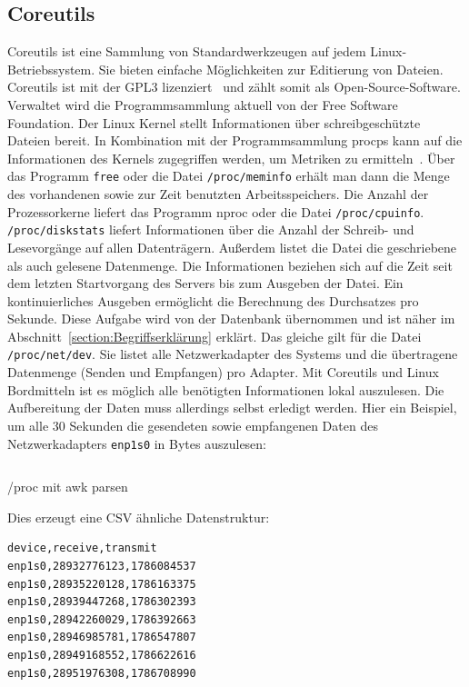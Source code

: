 \subsection{Coreutils}
Coreutils ist eine Sammlung von Standardwerkzeugen auf jedem
Linux-Betriebssystem. Sie bieten einfache Möglichkeiten zur Editierung von
Dateien. Coreutils ist mit der GPL3 lizenziert~\cite{coreutils} und zählt somit
als Open-Source-Software. Verwaltet wird die Programmsammlung aktuell von der
Free Software Foundation. Der Linux Kernel stellt Informationen über
schreibgeschützte Dateien bereit. In Kombination mit der Programmsammlung
procps kann auf die Informationen des Kernels zugegriffen werden, um Metriken
zu ermitteln~\cite{procps}. Über das Programm \texttt{free} oder die Datei
\texttt{/proc/meminfo} erhält man dann die Menge des vorhandenen sowie zur Zeit
benutzten Arbeitsspeichers. Die Anzahl der Prozessorkerne liefert das Programm
nproc oder die Datei \texttt{/proc/cpuinfo}. \texttt{/proc/diskstats} liefert
Informationen über die Anzahl der Schreib- und Lesevorgänge auf allen
Datenträgern. Außerdem listet die Datei die geschriebene als auch gelesene
Datenmenge. Die Informationen beziehen sich auf die Zeit seit dem letzten
Startvorgang des Servers bis zum Ausgeben der Datei. Ein kontinuierliches
Ausgeben ermöglicht die Berechnung des Durchsatzes pro Sekunde. Diese Aufgabe
wird von der Datenbank übernommen und ist näher im
Abschnitt~\ref{section:Begriffserklärung} erklärt. Das gleiche gilt für die
Datei \texttt{/proc/net/dev}. Sie listet alle Netzwerkadapter des Systems und
die übertragene Datenmenge (Senden und Empfangen) pro Adapter. Mit Coreutils
und Linux Bordmitteln ist es möglich alle benötigten Informationen lokal
auszulesen. Die Aufbereitung der Daten muss allerdings selbst erledigt werden.
Hier ein Beispiel, um alle 30 Sekunden die gesendeten sowie empfangenen Daten
des Netzwerkadapters \texttt{enp1s0} in Bytes auszulesen:

\begin{listing}
  \inputminted{bash}{../listings/coreutils-awk.txt}
  \caption{/proc mit awk parsen}
  \label{lst:aw}
\end{listing}

Dies erzeugt eine \gls{CSV} ähnliche Datenstruktur:

\begin{lstlisting}[language=bash,caption={traffic stats enp1s0}]
device,receive,transmit
enp1s0,28932776123,1786084537
enp1s0,28935220128,1786163375
enp1s0,28939447268,1786302393
enp1s0,28942260029,1786392663
enp1s0,28946985781,1786547807
enp1s0,28949168552,1786622616
enp1s0,28951976308,1786708990
\end{lstlisting}

